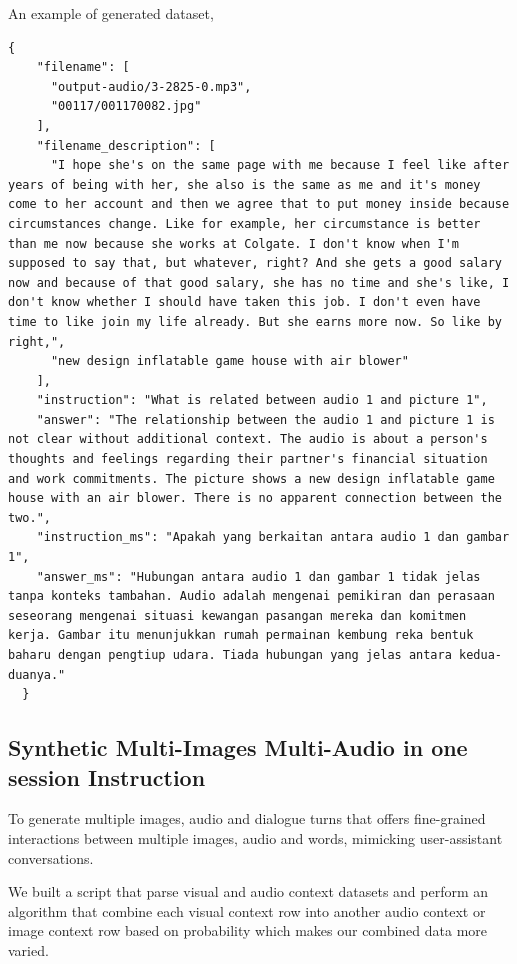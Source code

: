 \documentclass[preprint]{article}
\begin{document}
An example of generated dataset,

\begin{lstlisting}[breaklines=true]
  {
    "filename": [
      "output-audio/3-2825-0.mp3",
      "00117/001170082.jpg"
    ],
    "filename_description": [
      "I hope she's on the same page with me because I feel like after years of being with her, she also is the same as me and it's money come to her account and then we agree that to put money inside because circumstances change. Like for example, her circumstance is better than me now because she works at Colgate. I don't know when I'm supposed to say that, but whatever, right? And she gets a good salary now and because of that good salary, she has no time and she's like, I don't know whether I should have taken this job. I don't even have time to like join my life already. But she earns more now. So like by right,",
      "new design inflatable game house with air blower"
    ],
    "instruction": "What is related between audio 1 and picture 1",
    "answer": "The relationship between the audio 1 and picture 1 is not clear without additional context. The audio is about a person's thoughts and feelings regarding their partner's financial situation and work commitments. The picture shows a new design inflatable game house with an air blower. There is no apparent connection between the two.",
    "instruction_ms": "Apakah yang berkaitan antara audio 1 dan gambar 1",
    "answer_ms": "Hubungan antara audio 1 dan gambar 1 tidak jelas tanpa konteks tambahan. Audio adalah mengenai pemikiran dan perasaan seseorang mengenai situasi kewangan pasangan mereka dan komitmen kerja. Gambar itu menunjukkan rumah permainan kembung reka bentuk baharu dengan pengtiup udara. Tiada hubungan yang jelas antara kedua-duanya."
  }
\end{lstlisting}

\subsection{Synthetic Multi-Images Multi-Audio in one session Instruction}

To generate multiple images, audio and dialogue turns that offers fine-grained interactions between multiple images, audio and words, mimicking user-assistant conversations.

We built a script that parse visual and audio context datasets and perform an algorithm that combine each visual context row into another audio context or image context row based on probability which makes our combined data more varied.
\end{document}
